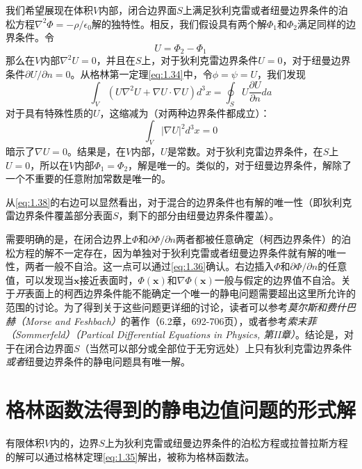 \documentclass[12pt]{book}
\numberwithin{equation}{chapter}
\numberwithin{figure}{chapter}
\numberwithin{footnote}{page}
\begin{document}
我们希望展现在体积$V$内部，闭合边界面$S$上满足狄利克雷或者纽曼边界条件的泊松方程$\nabla^2\Phi=-\rho/\epsilon_0$解的独特性。相反，我们假设具有两个解$\Phi_1$和$\Phi_2$满足同样的边界条件。令
\begin{equation}\label{eq:1.37}
    U=\Phi_2-\Phi_1
\end{equation}
那么在$V$内部$\nabla^2U=0$，并且在$S$上，对于狄利克雷边界条件$U=0$，对于纽曼边界条件$\partial U/\partial n=0$。从格林第一定理\autoref{eq:1.34}中，令$\phi=\psi=U$，我们发现
\begin{equation}\label{eq:1.38}
    \int_V (U\nabla^2U+\nabla U\cdot\nabla U)d^3x=\oint_S U\frac{\partial U}{\partial n}da
\end{equation}
对于具有特殊性质的$U$，这缩减为（对两种边界条件都成立）：
$$\int_V |\nabla U|^2d^3x=0$$
暗示了$\nabla U=0$。结果是，在$V$内部，$U$是常数。对于狄利克雷边界条件，在$S$上$U=0$，所以在$V$内部$\Phi_1=\Phi_2$，解是唯一的。类似的，对于纽曼边界条件，解除了一个不重要的任意附加常数是唯一的。

从\autoref{eq:1.38}的右边可以显然看出，对于混合的边界条件也有解的唯一性（即狄利克雷边界条件覆盖部分表面$S$，剩下的部分由纽曼边界条件覆盖）。

需要明确的是，在闭合边界上$\Phi$和$\partial \Phi/\partial n$两者都被任意确定（柯西边界条件）的泊松方程的解不一定存在，因为单独对于狄利克雷或者纽曼边界条件就有解的唯一性，两者一般不自洽。这一点可以通过\autoref{eq:1.36}确认。右边插入$\Phi$和$\partial \Phi/\partial n$的任意值，可以发现当$\mathbf{x}$接近表面时，$\Phi(\mathbf{x})$和$\nabla\Phi(\mathbf{x})$一般与假定的边界值不自洽。关于\textit{开}表面上的柯西边界条件能不能确定一个唯一的静电问题需要超出这里所允许的范围的讨论。为了得到关于这些问题更详细的讨论，读者可以参考\textit{莫尔斯和费什巴赫（Morse and Feshbach）}的著作（6.2章，692-706页），或者参考\textit{索末菲（Sommerfeld）（Partical Differential Equations in Physics, 第II章）}。结论是，对于在闭合边界面$S$（当然可以部分或全部位于无穷远处）上只有狄利克雷边界条件\textit{或者}纽曼边界条件的静电问题具有唯一解。

\section{格林函数法得到的静电边值问题的形式解}\label{sec:1.10}

有限体积$V$内的，边界$S$上为狄利克雷或纽曼边界条件的泊松方程或拉普拉斯方程的解可以通过格林定理\autoref{eq:1.35}解出，被称为格林函数法。
\end{document}
